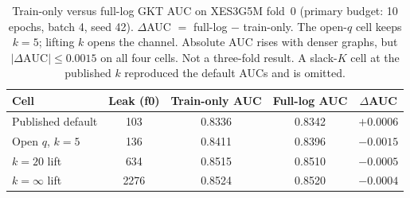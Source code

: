\begin{table}[t]
\centering
\caption{Train-only versus full-log GKT AUC on XES3G5M fold~0 (primary budget: 10 epochs, batch 4, seed 42). $\Delta$AUC $=$ full-log $-$ train-only. The open-$q$ cell keeps $k{=}5$; lifting $k$ opens the channel. Absolute AUC rises with denser graphs, but $|\Delta\text{AUC}|{\le}0.0015$ on all four cells. Not a three-fold result. A slack-$K$ cell at the published $k$ reproduced the default AUCs and is omitted.}
\label{tab:m4-phase-b-auc}
\footnotesize
\setlength{\tabcolsep}{4pt}
\begin{tabularx}{\linewidth}{@{} >{\RaggedRight\arraybackslash}X c c c c @{}}
\toprule
Cell & Leak (f0) & Train-only AUC & Full-log AUC & $\Delta$AUC \\
\midrule
Published default & 103 & 0.8336 & 0.8342 & $+0.0006$ \\
Open $q$, $k{=}5$ & 136 & 0.8411 & 0.8396 & $-0.0015$ \\
$k{=}20$ lift & 634 & 0.8515 & 0.8510 & $-0.0005$ \\
$k{=}\infty$ lift & 2276 & 0.8524 & 0.8520 & $-0.0004$ \\
\bottomrule
\end{tabularx}
\end{table}
